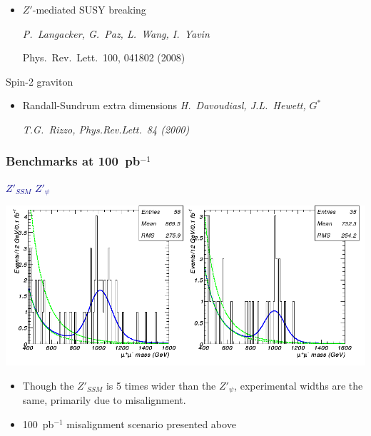 \documentclass[compress]{beamer}
\begin{document}
\begin{frame}
\begin{minipage}{\linewidth}
\begin{itemize}
{Phys.\ Rev.\ D74 (2006)}
\item $Z'$-mediated SUSY breaking {\it P.\ Langacker, G.\ Paz, L.\ Wang, I.\ Yavin

Phys.\ Rev.\ Lett.\ 100, 041802 (2008)}
\end{itemize}
\end{minipage}

\vfill {\small Spin-2 graviton}

\vspace{0.25 cm}
\begin{minipage}{\linewidth}\scriptsize
\begin{itemize}
\item Randall-Sundrum extra dimensions {\it H.\ Davoudiasl, J.L.\ Hewett,} \hfill $G^*$ \hspace{0.4 cm} \mbox{ }

{\it T.G.\ Rizzo, Phys.Rev.Lett.\ 84 (2000)}
\end{itemize}
\end{minipage}
\end{frame}

\begin{frame}
\frametitle{Benchmarks at 100~pb$^{-1}$}

\begin{center}
\textcolor{darkblue}{$Z'_{SSM}$} \hspace{4 cm} \textcolor{darkblue}{$Z'_\psi$}

\includegraphics[width=\linewidth]{zprime_mc_experiments.png}

\begin{itemize}
\item Though the $Z'_{SSM}$ is 5 times wider than the $Z'_\psi$,
experimental widths are the same, primarily due to misalignment.
\item 100~pb$^{-1}$ misalignment scenario presented above
\end{itemize}

\end{center}
\end{frame}
\end{document}
